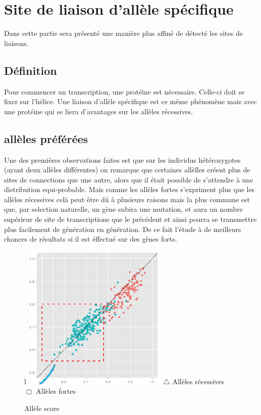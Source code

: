 \section{Site de liaison d'allèle spécifique}
Dans cette partie sera présenté une manière plus affiné de détecté les sites de liaisons. 
\subsection{Définition}
Pour commencer un transcription, une protéïne est nécessaire. Celle-ci doit se fixer sur l'hélice. Une liaison d'allèle spécifique est ce même phénomène mais avec une protéine qui se liera d'avantages sur les allèles récessives.

\subsection{allèles préférées}

Une des premières observations faites est que sur les individus hétérozygotes (ayant deux allèles différentes) on remarque que certaines allèlles créent plus de sites de connections que une autre, alors que il était possible de s'attendre à une distribution equi-probable. 
\newline
\newline
Mais comme les allèles fortes s'expriment plus que les allèles récessives celà peut être dû à plusieurs raisons mais la plus commune est que, par selection naturelle, un gène subira une mutation, et aura un nombre supérieur de site de transcriptions que le précédent et ainsi pourra se transmettre plus facilement de génération en génération. De ce fait l'étude à de meilleurs chances de résultats si il est éffectué sur des gènes forts.
\begin{figure}{l}{}
\centering
\includegraphics{grapheBestAllele}
\newline
\color{blue}
$\triangle$
\color{black} Allèles récessives
\\
\color{red}
$\Box$
\color{black} Allèles fortes
\caption{Allèle score}
\end{figure}


